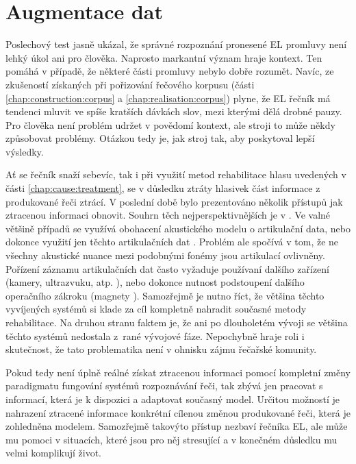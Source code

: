 \section{Augmentace dat}
\label{chap:realisation:augmentation}

Poslechový test jasně ukázal, že správné rozpoznání pronesené EL promluvy není lehký úkol ani pro člověka.
Naprosto markantní význam hraje kontext.
Ten pomáhá v případě, že některé části promluvy nebylo dobře rozumět.
Navíc, ze zkušeností získaných při pořizování řečového korpusu (části \ref{chap:construction:corpus} a \ref{chap:realisation:corpus}) plyne, že EL řečník má tendenci mluvit ve spíše kratších dávkách slov, mezi kterými dělá drobné pauzy.
Pro člověka není problém udržet v povědomí kontext, ale stroji to může někdy způsobovat problémy.
Otázkou tedy je, jak  stroj tak, aby poskytoval lepší výsledky.

Ať se řečník snaží sebevíc, tak i při využití metod rehabilitace hlasu uvedených v části \ref{chap:cause:treatment}, se v důsledku ztráty hlasivek část informace z produkované řeči ztrácí.
V poslední době bylo prezentováno několik přístupů jak ztracenou informaci obnovit.
Souhrn těch nejperspektivnějších je v \cite{Denby2010}.
Ve valné většině případů se využívá obohacení akustického modelu o artikulační data, nebo dokonce využití jen těchto artikulačních dat \cite{Hofe2013}.
Problém ale spočívá v tom, že ne všechny akustické nuance mezi podobnými fonémy jsou artikulací ovlivněny.
Pořízení záznamu artikulačních dat často vyžaduje používaní dalšího zařízení (kamery, ultrazvuku, atp. \cite{Hueber2010}), nebo dokonce nutnost podstoupení dalšího operačního zákroku (magnety \cite{Hofe2011}).
Samozřejmě je nutno říct, že většina těchto vyvíjených systémů si klade za cíl kompletně nahradit současné metody rehabilitace.
Na druhou stranu faktem je, že ani po dlouholetém vývoji se většina těchto systémů nedostala z~rané vývojové fáze.
Nepochybně hraje roli i skutečnost, že tato problematika není v ohnisku zájmu řečařské komunity.

Pokud tedy není úplně reálné získat ztracenou informaci pomocí kompletní změny paradigmatu fungování systémů rozpoznávání řeči, tak zbývá jen pracovat s informací, která je k dispozici a adaptovat současný model.
Určitou možností je nahrazení ztracené informace konkrétní cílenou změnou produkované řeči,
která je zohledněna modelem.
Samozřejmě takovýto přístup nezbaví řečníka EL, ale může mu pomoci v situacích, které jsou pro něj stresující a v konečném důsledku mu velmi komplikují život.


